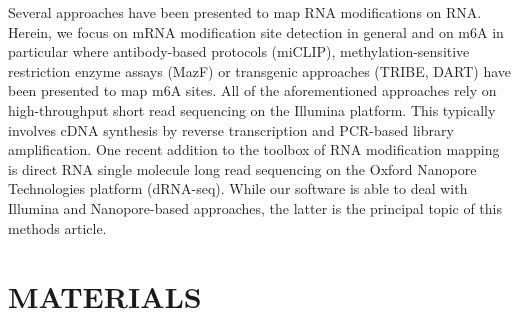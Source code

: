 \documentclass[times, 11pt, a4paper]{article}
\begin{document}
Several approaches have been presented to map RNA modifications on RNA. Herein, we focus on mRNA modification site detection in general and on m6A in particular where antibody-based protocols (miCLIP), methylation-sensitive restriction enzyme assays (MazF) or transgenic approaches (TRIBE, DART) have been presented to map m6A sites. All of the aforementioned approaches rely on high-throughput short read sequencing on the Illumina platform. This typically involves cDNA synthesis by reverse transcription and PCR-based library amplification. One recent addition to the toolbox of RNA modification mapping is direct RNA single molecule long read sequencing on the Oxford Nanopore Technologies platform (dRNA-seq). While our software is able to deal with Illumina and Nanopore-based approaches, the latter is the principal topic of this methods article.

\section*{MATERIALS}
\end{document}
